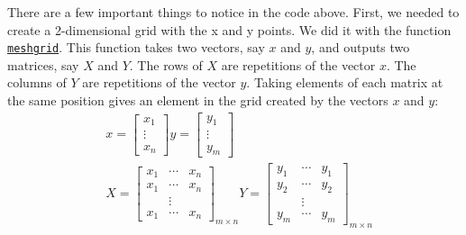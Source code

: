 \documentclass[12pt, a4paper]{article}
\begin{document}
There are a few important things to notice in the code above.
First, we needed to create a 2-dimensional grid with the x and y points.
We did it with the function \href{https://www.mathworks.com/help/matlab/ref/meshgrid.html}{\texttt{meshgrid}}.
This function takes two vectors, say \(x\) and \(y\), and outputs two matrices, say \(X\) and \(Y\).
The rows of \(X\) are repetitions of the vector \(x\).
The columns of \(Y\) are repetitions of the vector \(y\).
Taking elements of each matrix at the same position gives an element in the grid created by the vectors \(x\) and \(y\):
\begin{align*}
&x = \begin{bmatrix}
x_1\\
\vdots\\
x_n
\end{bmatrix}
y = \begin{bmatrix}
y_1\\
\vdots\\
y_m
\end{bmatrix}\\
&X= \begin{bmatrix}
x_1 & \cdots & x_n\\
x_1 & \cdots & x_n\\
& \vdots& \\
x_1 & \cdots & x_n
\end{bmatrix}_{m\times n}
Y= \begin{bmatrix}
y_1 & \cdots & y_1\\
y_2 & \cdots & y_2\\
& \vdots & \\
y_m & \cdots & y_m
\end{bmatrix}_{m\times n}
\end{align*}
\end{document}
